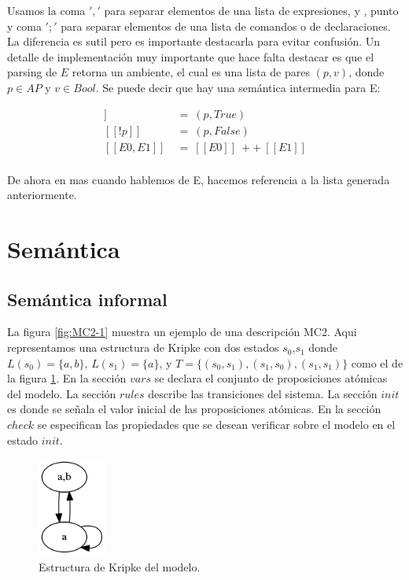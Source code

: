 Usamos la coma $','$ para separar elementos de una lista de expresiones, y , punto y coma $';'$ para separar elementos de una lista de comandos o de declaraciones. La diferencia es sutil pero es importante destacarla para evitar confusión.
Un detalle de implementación muy importante que hace falta destacar es que el parsing de $E$ retorna un ambiente, el cual es una lista de pares $(p,v)$, donde $p \in AP$ y $v \in Bool$. Se puede decir que hay una semántica intermedia para E:

\begin{align*}
[[p]]\ &=\ (p,True)\\
[[!p]]\ &=\ (p,False) \\
[[E0,E1]]\ &=\ [[E0]]\ ++\ [[E1]] \\
\end{align*}

De ahora en mas cuando hablemos de E, hacemos referencia a la lista generada anteriormente.

\section{Semántica} 

\subsection{Semántica informal}

La figura \ref{fig:MC2-1} muestra un ejemplo de una descripción MC2. Aqui representamos una estructura de Kripke con dos estados $s_{0}$,$s_{1}$ donde $L(s_{0}) = \{a,b\}$, $L(s_{1}) = \{a\}$, y $T = \{(s_{0},s_{1}),(s_{1},s_{0}),(s_{1},s_{1})\}$ como el de la figura \ref{fig:kripke4}. En la sección $vars$ se declara el conjunto de proposiciones atómicas del modelo. La sección $rules$ describe las transiciones del sistema. La sección $init$ es donde se señala el valor inicial de las proposiciones atómicas. En la sección $check$ se especifican las propiedades que se desean verificar sobre el modelo en el estado $init$.

\begin{figure}[H]
  \centering
  \includegraphics[width=0.2\textwidth]{Figures/kripke4.png}
  \caption{Estructura de Kripke del modelo.}
  \label{fig:kripke4}
\end{figure}


